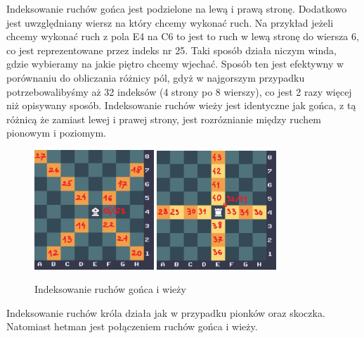 Indeksowanie ruchów gońca jest podzielone na lewą i prawą stronę. Dodatkowo jest uwzględniany wiersz na który chcemy wykonać ruch. Na przykład jeżeli chcemy wykonać ruch z pola E4 na C6 to jest to ruch w lewą stronę do wiersza 6, co jest reprezentowane przez indeks nr 25. Taki sposób działa niczym winda, gdzie wybieramy na jakie piętro chcemy wjechać. Sposób ten jest efektywny w porównaniu do obliczania różnicy pól, gdyż w najgorszym przypadku potrzebowalibyśmy aż 32 indeksów (4 strony po 8 wierszy), co jest 2 razy więcej niż opisywany sposób.
Indeksowanie ruchów wieży jest identyczne jak gońca, z tą różnicą że zamiast lewej i prawej strony, jest rozróznianie między ruchem pionowym i poziomym.
\begin{figure}[h]
\centering
\includegraphics[width=0.4\textwidth]{images/bishop_moves.png}
\hspace{1cm}
\includegraphics[width=0.4\textwidth]{images/rook_moves.png}
\caption{Indeksowanie ruchów gońca i wieży}
\end{figure}

Indeksowanie ruchów króla działa jak w przypadku pionków oraz skoczka. Natomiast hetman jest połączeniem ruchów gońca i wieży.


